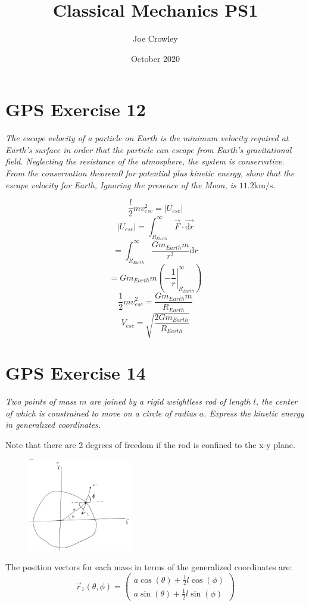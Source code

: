 \documentclass[12pt, letterpaper]{article}
\title{Classical Mechanics PS1}
\author{Joe Crowley}
\date{October 2020}
\begin{document}
\section{GPS Exercise 12}
\textit{The escape velocity of a particle on Earth is the minimum velocity required at Earth's surface in order that the particle can escape from Earth's gravitational field. Neglecting the resistance of the atmosphere, the system is conservative. From the conservation theorem0 for potential plus kinetic energy, show that the escape velocity for Earth, Ignoring the presence of the Moon, is $11.2 \mathrm{km} / \mathrm{s}$.}

$$
    \frac{l}{2} m v_{esc}^{2}= \left | U_{esc} \right|
$$
$$
\left|U_{esc}\right|=\int_{R_{Earth}}^{\infty} \vec{F} \cdot \vec{\mathrm{d} r}
$$
$$
=\int_{R_{Earth}}^{\infty} \frac{G m_{Earth} m}{r^{2}} \mathrm{d} r
$$
$$
=G m_{Earth} m\left(-\left.\frac{1}{r}\right|_{R_{Earth}} ^{\infty}\right)
$$
$$
\frac{1}{2} m v_{esc}^{2}=\frac{G m_{Earth} m}{R_{Earth}}
$$
$$
\boxed{V_{esc}=\sqrt{\frac{2 G m_{Earth}}{R_{Earth}}}}
$$


\section{GPS Exercise 14}
\textit{Two points of mass $m$ are joined by a rigid weightless rod of length $l$, the center of which is constrained to move on a circle of radius $a$. Express the kinetic energy in generalızed coordinates.}

Note that there are 2 degrees of freedom if the rod is confined to the x-y plane.
\begin{figure}[h!]
    \centering
    \includegraphics[width=0.4\textwidth]{figures/p14_fig1.png}
\end{figure}

The position vectors for each mass in terms of the generalized coordinates are:
$$
\vec{r}_{1}\left(\theta, \phi\right) =
\left(\begin{array}{c}
a \cos (\theta)+\frac{1}{2} l \cos (\phi) \\
a \sin (\theta)+\frac{1}{2} l \sin (\phi)
\end{array}\right)
$$
\end{document}
